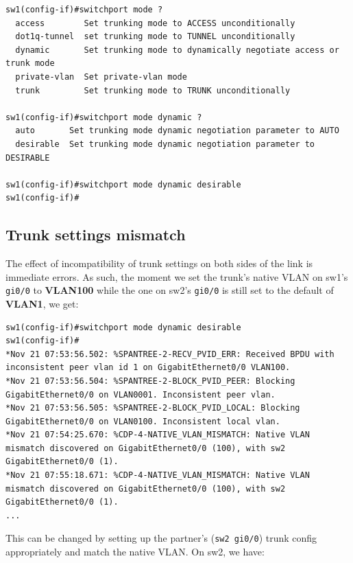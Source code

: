 \vspace{-15pt}
\begin{verbatim}
sw1(config-if)#switchport mode ?
  access        Set trunking mode to ACCESS unconditionally
  dot1q-tunnel  set trunking mode to TUNNEL unconditionally
  dynamic       Set trunking mode to dynamically negotiate access or trunk mode
  private-vlan  Set private-vlan mode
  trunk         Set trunking mode to TRUNK unconditionally

sw1(config-if)#switchport mode dynamic ?
  auto       Set trunking mode dynamic negotiation parameter to AUTO
  desirable  Set trunking mode dynamic negotiation parameter to DESIRABLE

sw1(config-if)#switchport mode dynamic desirable
sw1(config-if)#
\end{verbatim}
\vspace{-10pt}

\subsection{Trunk settings mismatch}
The effect of incompatibility of trunk settings on both sides of the link is immediate errors. As such, the moment we set the trunk's native VLAN on sw1's \verb|gi0/0| to \textbf{VLAN100} while the one on sw2's \verb|gi0/0| is still set to the default of \textbf{VLAN1}, we get: 

\vspace{-15pt}
\begin{verbatim}
sw1(config-if)#switchport mode dynamic desirable
sw1(config-if)#
*Nov 21 07:53:56.502: %SPANTREE-2-RECV_PVID_ERR: Received BPDU with inconsistent peer vlan id 1 on GigabitEthernet0/0 VLAN100.
*Nov 21 07:53:56.504: %SPANTREE-2-BLOCK_PVID_PEER: Blocking GigabitEthernet0/0 on VLAN0001. Inconsistent peer vlan.
*Nov 21 07:53:56.505: %SPANTREE-2-BLOCK_PVID_LOCAL: Blocking GigabitEthernet0/0 on VLAN0100. Inconsistent local vlan.
*Nov 21 07:54:25.670: %CDP-4-NATIVE_VLAN_MISMATCH: Native VLAN mismatch discovered on GigabitEthernet0/0 (100), with sw2 GigabitEthernet0/0 (1).
*Nov 21 07:55:18.671: %CDP-4-NATIVE_VLAN_MISMATCH: Native VLAN mismatch discovered on GigabitEthernet0/0 (100), with sw2 GigabitEthernet0/0 (1).
...
\end{verbatim}
\vspace{-10pt}

\noindent
This can be changed by setting up the partner's (\verb|sw2 gi0/0|) trunk config appropriately and match the native VLAN. On sw2, we have: 


